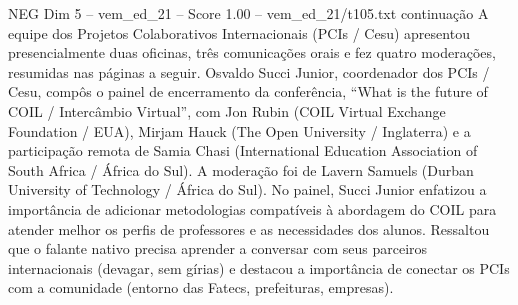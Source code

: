 \begin{textsample}{NEG Dim 5 – vem\_ed\_21 – Score 1.00 – vem\_ed\_21/t105.txt}  \label{ex:f5_neg_076}
continuação A equipe dos Projetos Colaborativos Internacionais (PCIs / Cesu) apresentou presencialmente duas oficinas, três comunicações orais e fez quatro moderações, resumidas nas páginas a seguir.
Osvaldo Succi Junior, coordenador dos PCIs / Cesu, compôs o painel de encerramento da conferência, “What is the future of COIL / Intercâmbio Virtual”, com Jon Rubin (COIL Virtual Exchange Foundation / EUA), Mirjam Hauck (The Open University / Inglaterra) e a participação remota de Samia Chasi (International Education Association of South Africa / África do Sul).
A moderação foi de Lavern Samuels (Durban University of Technology / África do Sul).
No painel, Succi Junior enfatizou a importância de adicionar metodologias compatíveis à abordagem do COIL para atender melhor os perfis de professores e as necessidades dos alunos.
Ressaltou que o falante nativo precisa aprender a conversar com seus parceiros internacionais (devagar, sem gírias) e destacou a importância de conectar os PCIs com a comunidade (entorno das Fatecs, prefeituras, empresas).

\end{textsample}
